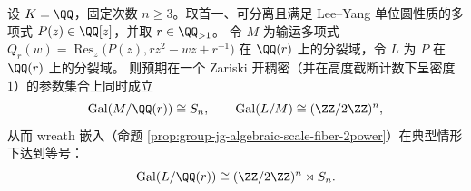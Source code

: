 \begin{conjecture}\label{conj:group-jg-generic-maximal-wreath}
设 \(K=\QQ\)，固定次数 \(n\ge 3\)。取首一、可分离且满足 Lee--Yang 单位圆性质的多项式 \(P(z)\in\QQ[z]\)，并取 \(r\in\QQ_{>1}\)。
令 \(M\) 为输运多项式 \(Q_r(w)=\operatorname{Res}_z\!\bigl(P(z),r z^2-w z+r^{-1}\bigr)\) 在 \(\QQ(r)\) 上的分裂域，令 \(L\) 为 \(P\) 在 \(\QQ(r)\) 上的分裂域。
则预期在一个 Zariski 开稠密（并在高度截断计数下呈密度 \(1\)）的参数集合上同时成立
\[
\operatorname{Gal}(M/\QQ(r))\cong S_n,
\qquad
\operatorname{Gal}(L/M)\cong (\ZZ/2\ZZ)^n,
\]
从而 wreath 嵌入（命题 \ref{prop:group-jg-algebraic-scale-fiber-2power}）在典型情形下达到等号：
\[
\operatorname{Gal}(L/\QQ(r))\cong (\ZZ/2\ZZ)^n\rtimes S_n.
\]
\end{conjecture}

